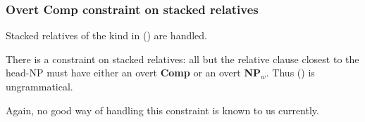 \subsubsection{Overt Comp constraint on stacked relatives}
Stacked relatives of the kind in () are handled.


There is a constraint on stacked relatives: all but the relative clause
closest to the head-NP must have either an overt {\bf Comp} or 
an overt {\bf NP$_{w}$}. Thus () is ungrammatical.


Again, no good way of handling this constraint is known to us 
currently. 
